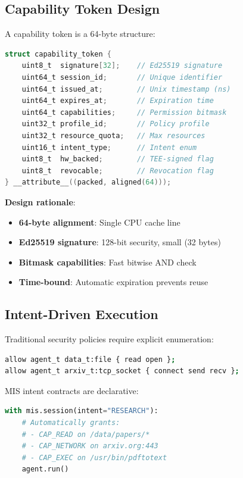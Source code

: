 \documentclass[11pt,a4paper]{article}
\begin{document}
\subsection{Capability Token Design}

A capability token is a 64-byte structure:

\begin{lstlisting}[language=C, caption=Capability token structure]
struct capability_token {
    uint8_t  signature[32];    // Ed25519 signature
    uint64_t session_id;       // Unique identifier
    uint64_t issued_at;        // Unix timestamp (ns)
    uint64_t expires_at;       // Expiration time
    uint64_t capabilities;     // Permission bitmask
    uint32_t profile_id;       // Policy profile
    uint32_t resource_quota;   // Max resources
    uint16_t intent_type;      // Intent enum
    uint8_t  hw_backed;        // TEE-signed flag
    uint8_t  revocable;        // Revocation flag
} __attribute__((packed, aligned(64)));
\end{lstlisting}

\textbf{Design rationale}:
\begin{itemize}
    \item \textbf{64-byte alignment}: Single CPU cache line
    \item \textbf{Ed25519 signature}: 128-bit security, small (32 bytes)
    \item \textbf{Bitmask capabilities}: Fast bitwise AND check
    \item \textbf{Time-bound}: Automatic expiration prevents reuse
\end{itemize}

\subsection{Intent-Driven Execution}

Traditional security policies require explicit enumeration:

\begin{lstlisting}[language=bash, caption=Traditional policy (SELinux-style)]
allow agent_t data_t:file { read open };
allow agent_t arxiv_t:tcp_socket { connect send recv };
\end{lstlisting}

MIS intent contracts are declarative:

\begin{lstlisting}[language=Python, caption=Intent-driven execution]
with mis.session(intent="RESEARCH"):
    # Automatically grants:
    # - CAP_READ on /data/papers/*
    # - CAP_NETWORK on arxiv.org:443
    # - CAP_EXEC on /usr/bin/pdftotext
    agent.run()
\end{lstlisting}
\end{document}
